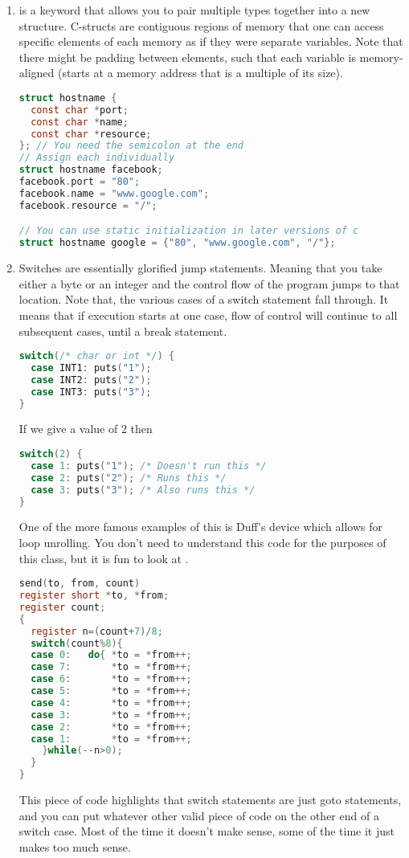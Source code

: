 \begin{enumerate}
	    \item {} is a keyword that allows you to pair multiple types together into a new structure.
        C-structs are contiguous regions of memory that one can access specific elements of each memory as if they were separate variables. Note that there might be padding between elements, such that each variable is memory-aligned (starts at a memory address that is a multiple of its size).

	      \begin{lstlisting}[language=C]
struct hostname {
  const char *port;
  const char *name;
  const char *resource;
}; // You need the semicolon at the end
// Assign each individually
struct hostname facebook;
facebook.port = "80";
facebook.name = "www.google.com";
facebook.resource = "/";

// You can use static initialization in later versions of c
struct hostname google = {"80", "www.google.com", "/"};
\end{lstlisting}


	    \item {} Switches are essentially glorified jump statements.
        Meaning that you take either a byte or an integer and the control flow of the program jumps to that location.
        Note that, the various cases of a switch statement fall through. It means that if execution starts at one case, flow of control will continue to all subsequent cases, until a break statement.
	      \\
	      \begin{lstlisting}[language=C]
switch(/* char or int */) {
  case INT1: puts("1");
  case INT2: puts("2");
  case INT3: puts("3");
}
\end{lstlisting}

	      If we give a value of 2 then
	      \\
	      \begin{lstlisting}[language=C]
switch(2) {
  case 1: puts("1"); /* Doesn't run this */
  case 2: puts("2"); /* Runs this */
  case 3: puts("3"); /* Also runs this */
}
\end{lstlisting}

        One of the more famous examples of this is Duff's device which allows for loop unrolling. You don't need to understand this code for the purposes of this class, but it is fun to look at \cite{duff}.

        \begin{lstlisting}[language=C]
send(to, from, count)
register short *to, *from;
register count;
{
  register n=(count+7)/8;
  switch(count%8){
  case 0:	do{	*to = *from++;
  case 7:		*to = *from++;
  case 6:		*to = *from++;
  case 5:		*to = *from++;
  case 4:		*to = *from++;
  case 3:		*to = *from++;
  case 2:		*to = *from++;
  case 1:		*to = *from++;
    }while(--n>0);
  }
}
\end{lstlisting}
        This piece of code highlights that switch statements are just goto statements, and you can put whatever other valid piece of code on the other end of a switch case. Most of the time it doesn't make sense, some of the time it just makes too much sense.


\end{enumerate}
